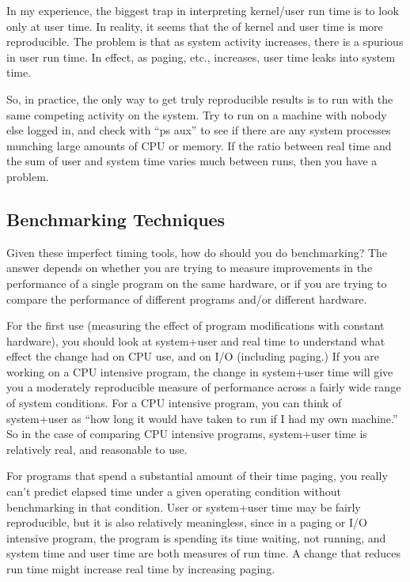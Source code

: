 In my experience, the biggest trap in interpreting kernel/user run time is
to look only at user time.  In reality, it seems that the  of kernel
and user time is more reproducible.  The problem is that as system activity
increases, there is a spurious  in user run time.  In effect, as
paging, etc., increases, user time leaks into system time.

So, in practice, the only way to get truly reproducible results is to run
with the same competing activity on the system.  Try to run on a machine
with nobody else logged in, and check with ``ps aux'' to see if there are any
system processes munching large amounts of CPU or memory.  If the ratio
between real time and the sum of user and system time varies much between
runs, then you have a problem.


\subsection{Benchmarking Techniques}

Given these imperfect timing tools, how do should you do benchmarking?  The
answer depends on whether you are trying to measure improvements in the
performance of a single program on the same hardware, or if you are trying to
compare the performance of different programs and/or different hardware.

For the first use (measuring the effect of program modifications with
constant hardware), you should look at  system+user and real time to
understand what effect the change had on CPU use, and on I/O (including
paging.)  If you are working on a CPU intensive program, the change in
system+user time will give you a moderately reproducible measure of
performance across a fairly wide range of system conditions.  For a CPU
intensive program, you can think of system+user as ``how long it would have
taken to run if I had my own machine.''  So in the case of comparing CPU
intensive programs, system+user time is relatively real, and reasonable to
use.

For programs that spend a substantial amount of their time paging, you
really can't predict elapsed time under a given operating condition without
benchmarking in that condition.  User or system+user time may be fairly
reproducible, but it is also relatively meaningless, since in a paging or
I/O intensive program, the program is spending its time waiting, not
running, and system time and user time are both measures of run time.
A change that reduces run time might increase real time by increasing
paging.

